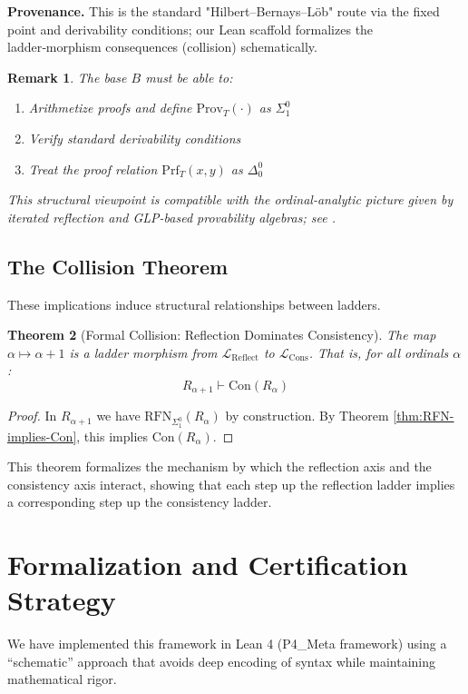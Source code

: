 \documentclass[11pt]{article}
\newtheorem{theorem}{Theorem}[section]
\newtheorem{remark}[theorem]{Remark}
\newcommand{\Con}{\mathrm{Con}}
\newcommand{\RFNSigOne}{\mathrm{RFN}_{\Sigma^0_1}}
\newcommand{\LCons}{\mathcal{L}_{\mathrm{Cons}}}
\newcommand{\LReflect}{\mathcal{L}_{\mathrm{Reflect}}}
\newcommand{\Prov}{\mathrm{Prov}}
\begin{document}
\begin{mdframed}[style=provenance]
\textbf{Provenance.} This is the standard "Hilbert–Bernays–Löb" route via the fixed point and derivability
conditions; our Lean scaffold formalizes the ladder‑morphism consequences (collision) schematically.
\end{mdframed}

\begin{remark}
The base $B$ must be able to:
\begin{enumerate}
\item Arithmetize proofs and define $\Prov_T(\cdot)$ as $\Sigma^0_1$
\item Verify standard derivability conditions
\item Treat the proof relation $\mathrm{Prf}_T(x,y)$ as $\Delta^0_0$
\end{enumerate}
This structural viewpoint is compatible with the ordinal-analytic picture given by iterated reflection and GLP-based provability algebras; see \cite{Beklemishev2003,Beklemishev2004,ArtemovBeklemishev2004}.
\end{remark}

\subsection{The Collision Theorem}
These implications induce structural relationships between ladders.

\begin{theorem}[Formal Collision: Reflection Dominates Consistency]
The map $\alpha \mapsto \alpha+1$ is a ladder morphism from $\LReflect$ to $\LCons$. That is, for all ordinals $\alpha$:
$$R_{\alpha+1} \vdash \Con(R_\alpha)$$
\end{theorem}
\begin{proof}
In $R_{\alpha+1}$ we have $\RFNSigOne(R_\alpha)$ by construction. By Theorem \ref{thm:RFN-implies-Con}, this implies $\Con(R_\alpha)$.
\end{proof}

This theorem formalizes the mechanism by which the reflection axis and the consistency axis interact, showing that each step up the reflection ladder implies a corresponding step up the consistency ladder.

\section{Formalization and Certification Strategy}
We have implemented this framework in Lean 4 (P4\_Meta framework) using a ``schematic'' approach that avoids deep encoding of syntax while maintaining mathematical rigor.
\end{document}
